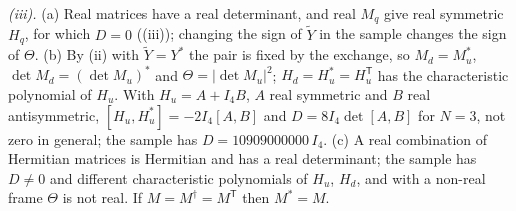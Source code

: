 \emph{(iii).} (a) Real matrices have a real determinant, and real $M_{q}$ give real symmetric $H_{q}$, for which $D = 0$ ((iii)); changing the sign of $\tilde{Y}$ in the sample changes the sign of $\Theta$. (b) By (ii) with $\tilde{Y} = Y^{*}$ the pair is fixed by the exchange, so $M_{d} = M_{u}^{*}$, $\det M_{d} = (\det M_{u})^{*}$ and $\Theta = |\det M_{u}|^{2}$; $H_{d} = H_{u}^{*} = H_{u}^{\mathsf{T}}$ has the characteristic polynomial of $H_{u}$. With $H_{u} = A + I_{4}B$, $A$ real symmetric and $B$ real antisymmetric, $[H_{u}, H_{u}^{*}] = -2I_{4}[A, B]$ and $D = 8I_{4}\det[A, B]$ for $N = 3$, not zero in general; the sample has $D = 10909000000\,I_{4}$. (c) A real combination of Hermitian matrices is Hermitian and has a real determinant; the sample has $D \neq 0$ and different characteristic polynomials of $H_{u}$, $H_{d}$, and with a non-real frame $\Theta$ is not real. If $M = M^{\dagger} = M^{\mathsf{T}}$ then $M^{*} = M$.

